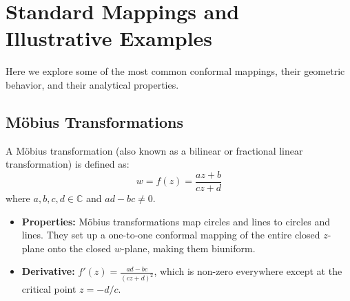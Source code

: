 \documentclass[12pt,a4paper]{article}
\begin{document}
\section{Standard Mappings and Illustrative Examples}
Here we explore some of the most common conformal mappings, their geometric behavior, and their analytical properties.

\subsection{M\"obius Transformations}
A M\"obius transformation (also known as a bilinear or fractional linear transformation) is defined as:
\begin{equation}
    w = f(z) = \frac{az + b}{cz + d}
\end{equation}
where $a, b, c, d \in \mathbb{C}$ and $ad - bc \neq 0$.
\begin{itemize}
    \item \textbf{Properties:} Möbius transformations map circles and lines to circles and lines. They set up a one-to-one conformal mapping of the entire closed $z$-plane onto the closed $w$-plane, making them biuniform.
    \item \textbf{Derivative:} $f'(z) = \frac{ad - bc}{(cz + d)^2}$, which is non-zero everywhere except at the critical point $z = -d/c$.
\end{itemize}
\end{document}
